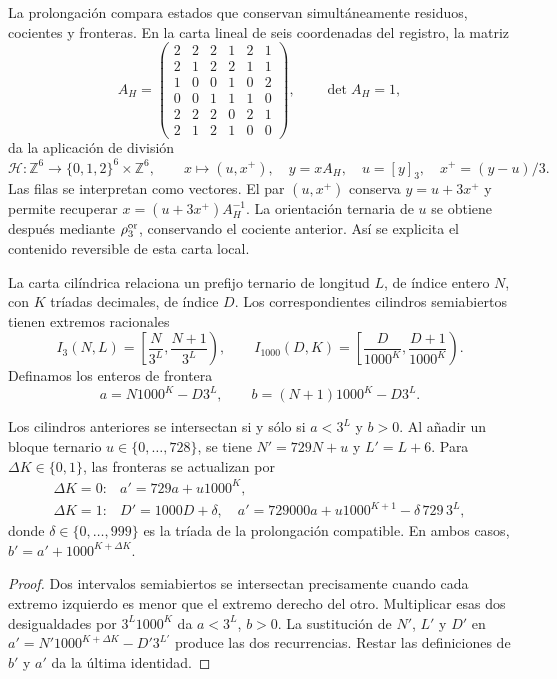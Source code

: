 La prolongación compara estados que conservan simultáneamente residuos,
cocientes y fronteras. En la carta lineal de seis coordenadas del registro,
la matriz
\[
 A_H=\begin{pmatrix}
 2&2&2&1&2&1\\2&1&2&2&1&1\\1&0&0&1&0&2\\
 0&0&1&1&1&0\\2&2&2&0&2&1\\2&1&2&1&0&0
 \end{pmatrix},\qquad\det A_H=1,
\]
da la aplicación de división
\begin{equation}
 \mathcal H:\mathbb Z^6\longrightarrow
 \{0,1,2\}^6\times\mathbb Z^6,\qquad
 x\longmapsto(u,x^+),\quad
 y=xA_H,\quad u=[y]_3,\quad x^+=(y-u)/3.
 \label{ii:ii:tpk-hensel-local}
\end{equation}
Las filas se interpretan como vectores. El par \((u,x^+)\) conserva
\(y=u+3x^+\) y permite recuperar
\(x=(u+3x^+)A_H^{-1}\). La orientación ternaria de \(u\) se obtiene
después mediante \(\rho_3^{\rm or}\), conservando el cociente anterior.
Así se explicita el contenido reversible de esta carta local.

La carta cilíndrica relaciona un prefijo ternario de longitud \(L\), de
índice entero \(N\), con \(K\) tríadas decimales, de índice \(D\).
Los correspondientes cilindros semiabiertos tienen extremos racionales
\[
 I_3(N,L)=\left[\frac N{3^L},\frac{N+1}{3^L}\right),\qquad
 I_{1000}(D,K)=\left[\frac D{1000^K},\frac{D+1}{1000^K}\right).
\]
Definamos los enteros de frontera
\[
 a=N1000^K-D3^L,\qquad b=(N+1)1000^K-D3^L.
\]

\begin{lemma}
\label{ii:ii:tpk-cilindros-enteros}
Los cilindros anteriores se intersectan si y sólo si
\(a<3^L\) y \(b>0\). Al añadir un bloque ternario
\(u\in\{0,\ldots,728\}\), se tiene \(N'=729N+u\) y
\(L'=L+6\). Para \(\Delta K\in\{0,1\}\), las fronteras se
actualizan por
\[
 \begin{array}{ll}
 \Delta K=0:&a'=729a+u1000^K,\\[2pt]
 \Delta K=1:&D'=1000D+\delta,\quad
 a'=729000a+u1000^{K+1}-\delta\,729\,3^L,
 \end{array}
\]
donde \(\delta\in\{0,\ldots,999\}\) es la tríada de la
prolongación compatible. En ambos casos,
\(b'=a'+1000^{K+\Delta K}\).
\end{lemma}
\begin{proof}
Dos intervalos semiabiertos se intersectan precisamente cuando cada extremo
izquierdo es menor que el extremo derecho del otro. Multiplicar esas dos
desigualdades por \(3^L1000^K\) da \(a<3^L\), \(b>0\).
La sustitución de \(N'\), \(L'\) y \(D'\) en
\(a'=N'1000^{K+\Delta K}-D'3^{L'}\) produce las dos recurrencias.
Restar las definiciones de \(b'\) y \(a'\) da la última identidad.
\end{proof}

